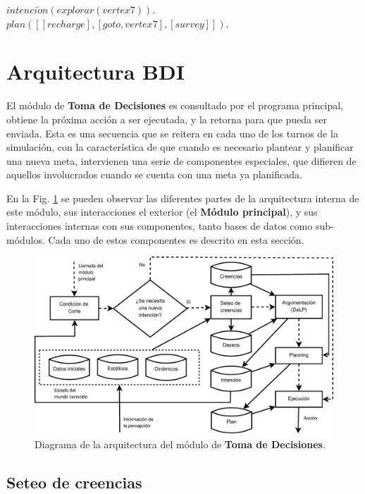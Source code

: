 \documentclass[oneside]{book}
\theoremstyle{definition}
\theoremstyle{example}
\newcommand{\lit}[1]{\mbox{$ #1$}}
\begin{document}
\vspace*{1em}
\noindent\lit{intenci\acute{o}n(explorar(vertex7)).}\\
\lit{plan([[recharge], [goto, vertex7], [survey]]).}

\section{Arquitectura BDI} %

\label{sec:arquitecturaBDI}

El módulo de \textbf{Toma de Decisiones} es consultado por el programa 
principal, obtiene la próxima acción a ser ejecutada, y la retorna para que 
pueda ser enviada. Esta es una secuencia que se reitera en cada uno de los 
turnos de la simulación, con la característica de que cuando es necesario 
plantear y planificar una nueva meta, intervienen una serie de componentes 
especiales, que difieren de aquellos involucrados cuando se cuenta con una 
meta ya planificada. 

En la Fig. \ref{fig:agentProlog} se pueden observar las diferentes partes de la
arquitectura interna de este módulo, sus interacciones el exterior (el 
\textbf{Módulo principal}), y sus interacciones internas con sus componentes,
tanto bases de datos como sub-módulos. Cada uno de estos componentes es 
descrito en esta sección.

\begin{figure}
 \includegraphics[width=\textwidth]{agent_prolog.eps}
 \caption{Diagrama de la arquitectura del módulo de \textbf{Toma de Decisiones}.}
 \label{fig:agentProlog}
\end{figure}

\subsection{Seteo de creencias}
\end{document}
